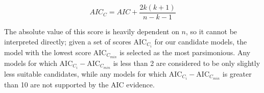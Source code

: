 \documentclass[../../ArchStats.tex]{subfiles}
\begin{document}
\[AIC_C = AIC + \frac{2k(k+1)}{n-k-1} \]

The absolute value of this score is heavily dependent on $n$, so it cannot be interpreted directly; given a set of scores AIC$_{C_i}$ for our candidate models, the model with the lowest score AIC$_{C_{min}}$ is selected as the most parsimonious. Any models for which AIC$_{C_i} - $AIC$_{C_{min}}$ is less than 2 are considered to be only slightly less suitable candidates, while any models for which AIC$_{C_i} - $AIC$_{C_{min}}$ is greater than 10 are not supported by the AIC evidence.


\end{document}

